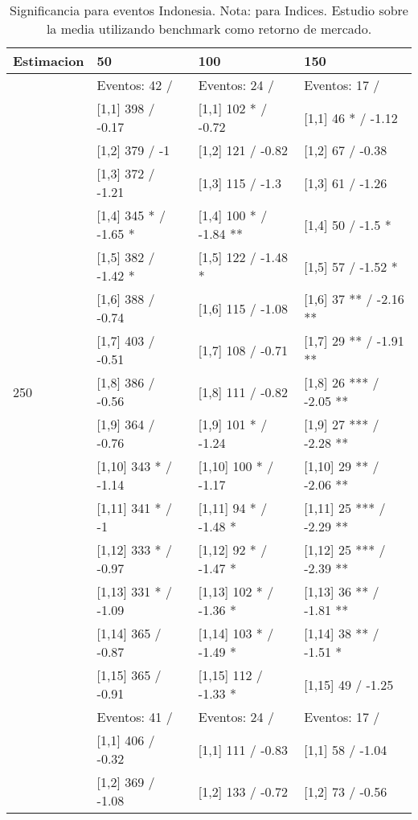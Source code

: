 \begin{table}

\caption{Significancia para eventos Indonesia. Nota: para Indices. Estudio sobre la media utilizando benchmark como retorno de mercado.}
\centering
\begin{tabular}[t]{llll}
\toprule
Estimacion & 50 & 100 & 150\\
\midrule
 & Eventos:  42 / & Eventos:  24 / & Eventos:  17 /\\
 & {}[1,1] 398  / -0.17 & {}[1,1] 102 * / -0.72 & {}[1,1] 46 * / -1.12\\
 & {}[1,2] 379  / -1 & {}[1,2] 121  / -0.82 & {}[1,2] 67  / -0.38\\
 & {}[1,3] 372  / -1.21 & {}[1,3] 115  / -1.3 & {}[1,3] 61  / -1.26\\
 & {}[1,4] 345 * / -1.65 * & {}[1,4] 100 * / -1.84 ** & {}[1,4] 50  / -1.5 *\\
\addlinespace
 & {}[1,5] 382  / -1.42 * & {}[1,5] 122  / -1.48 * & {}[1,5] 57  / -1.52 *\\
 & {}[1,6] 388  / -0.74 & {}[1,6] 115  / -1.08 & {}[1,6] 37 ** / -2.16 **\\
 & {}[1,7] 403  / -0.51 & {}[1,7] 108  / -0.71 & {}[1,7] 29 ** / -1.91 **\\
250 & {}[1,8] 386  / -0.56 & {}[1,8] 111  / -0.82 & {}[1,8] 26 *** / -2.05 **\\
 & {}[1,9] 364  / -0.76 & {}[1,9] 101 * / -1.24 & {}[1,9] 27 *** / -2.28 **\\
\addlinespace
 & {}[1,10] 343 * / -1.14 & {}[1,10] 100 * / -1.17 & {}[1,10] 29 ** / -2.06 **\\
 & {}[1,11] 341 * / -1 & {}[1,11] 94 * / -1.48 * & {}[1,11] 25 *** / -2.29 **\\
 & {}[1,12] 333 * / -0.97 & {}[1,12] 92 * / -1.47 * & {}[1,12] 25 *** / -2.39 **\\
 & {}[1,13] 331 * / -1.09 & {}[1,13] 102 * / -1.36 * & {}[1,13] 36 ** / -1.81 **\\
 & {}[1,14] 365  / -0.87 & {}[1,14] 103 * / -1.49 * & {}[1,14] 38 ** / -1.51 *\\
\addlinespace
 & {}[1,15] 365  / -0.91 & {}[1,15] 112  / -1.33 * & {}[1,15] 49  / -1.25\\
 & Eventos:  41 / & Eventos:  24 / & Eventos:  17 /\\
 & {}[1,1] 406  / -0.32 & {}[1,1] 111  / -0.83 & {}[1,1] 58  / -1.04\\
 & {}[1,2] 369  / -1.08 & {}[1,2] 133  / -0.72 & {}[1,2] 73  / -0.56\\

\end{tabular}
\end{table}
